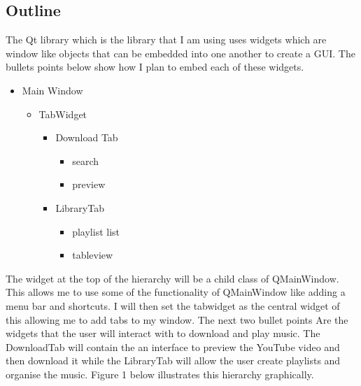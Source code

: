 \documentclass{article}
\begin{document}
\subsection{Outline}\label{outline}
The Qt library which is the library that I am using uses widgets which are window
like objects that can be embedded into one another to create a GUI. The bullets
points below show how I plan to embed each of these widgets.
\begin{itemize}
    \item Main Window
        \begin{itemize}
            \item TabWidget
                \begin{itemize}
                    \item Download Tab
                        \begin{itemize}
                            \item search
                            \item preview
                        \end{itemize}
                    \item LibraryTab
                        \begin{itemize}
                            \item playlist list
                            \item tableview
                        \end{itemize}
                \end{itemize}
        \end{itemize}
\end{itemize}
The widget at the top of the hierarchy will be a child class of QMainWindow. This
allows me to use some of the functionality of QMainWindow like adding a menu bar
and shortcuts. I will then set the tabwidget as the central widget of this
allowing me to add tabs to my window. The next two bullet points Are the widgets
that the user will interact with to download and play music. The DownloadTab will
contain the an interface to preview the YouTube video and then download it while
the LibraryTab will allow the user create playlists and organise the music. Figure 1
below illustrates this hierarchy graphically.
\end{document}
